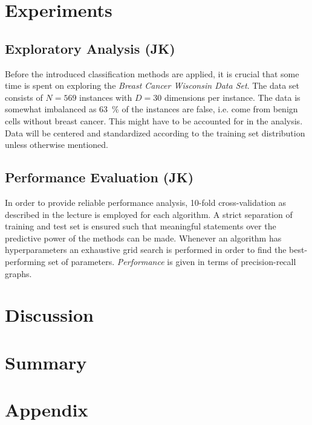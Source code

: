 \documentclass[12pt, a4paper]{scrartcl}
\begin{document}
\section{Experiments}
\label{sec:expe}

\subsection{Exploratory Analysis (JK)}
Before the introduced classification methods are applied, it is crucial that some time is spent on exploring the \emph{Breast Cancer Wisconsin Data Set}.
The data set consists of $N=569$ instances with $D=30$ dimensions per instance. The data is somewhat imbalanced as \SI{63}{\percent} of the instances are false, i.e. come from benign cells without breast cancer. This might have to be accounted for in the analysis.
Data will be centered and standardized according to the training set distribution unless otherwise mentioned.

\subsection{Performance Evaluation (JK) }
In order to provide reliable performance analysis, 10-fold cross-validation as described in the lecture is employed for each algorithm. A strict separation of training and test set is ensured such that meaningful statements over the predictive power of the methods can be made.
Whenever an algorithm has hyperparameters an exhaustive grid search is performed in order to find the best-performing set of parameters. \emph{Performance} is given in terms of precision-recall graphs. 


\section{Discussion}
\label{sec:discu}



\section{Summary}

\section{Appendix}




\end{document}
